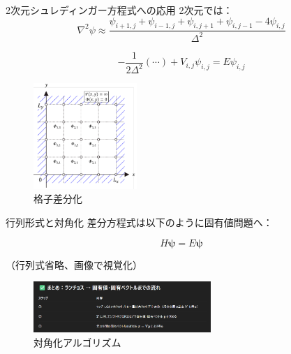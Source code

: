 \documentclass[dvipdfmx]{beamer}
\begin{document}
\begin{frame}{2次元シュレディンガー方程式への応用}
2次元では：
\[
\nabla^2 \psi \approx \frac{\psi_{i+1,j} + \psi_{i-1,j} + \psi_{i,j+1} + \psi_{i,j-1} - 4\psi_{i,j}}{\Delta^2}
\]

\[
-\frac{1}{2\Delta^2} (\cdots) + V_{i,j} \psi_{i,j} = E \psi_{i,j}
\]

\begin{figure}[H]
\centering
\includegraphics[width=0.35\textwidth]{images/二次元.png}
\caption{格子差分化}
\end{figure}
\end{frame}

\begin{frame}{行列形式と対角化}
差分方程式は以下のように固有値問題へ：

\[
H \bm{\psi} = E \bm{\psi}
\]

（行列式省略、画像で視覚化）

\begin{figure}[H]
\centering
\includegraphics[width=0.6\textwidth]{images/アルゴリズム.png}
\caption{対角化アルゴリズム}
\end{figure}
\end{frame}
\end{document}
